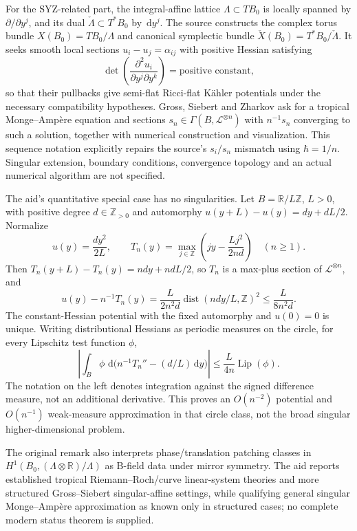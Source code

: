 \documentclass[11pt]{article}
\newcommand{\Z}{\mathbb{Z}}
\newcommand{\R}{\mathbb{R}}
\newcommand{\dd}{\,\mathrm{d}}
\begin{document}
For the SYZ-related part, the integral-affine lattice \(\Lambda\subset TB_0\) is locally spanned by \(\partial/\partial y^j\), and its dual \(\check\Lambda\subset T^*B_0\) by \(\dd y^j\). The source constructs the complex torus bundle \(X(B_0)=TB_0/\Lambda\) and canonical symplectic bundle \(\check X(B_0)=T^*B_0/\check\Lambda\). It seeks smooth local sections \(u_i-u_j=\alpha_{ij}\) with positive Hessian satisfying
\[
 \det\left(\frac{\partial^2u_i}{\partial y^j\partial y^k}\right)
       =\text{positive constant},
\]
so that their pullbacks give semi-flat Ricci-flat K\"ahler potentials under the necessary compatibility hypotheses. Gross, Siebert and Zharkov ask for a tropical Monge--Amp\`ere equation and sections \(s_n\in\Gamma(B,\mathcal L^{\otimes n})\) with \(n^{-1}s_n\) converging to such a solution, together with numerical construction and visualization. This sequence notation explicitly repairs the source's \(s_i/s_n\) mismatch using \(\hbar=1/n\). Singular extension, boundary conditions, convergence topology and an actual numerical algorithm are not specified.

The aid's quantitative special case has no singularities. Let \(B=\R/L\Z\), \(L>0\), with positive degree \(d\in\Z_{>0}\) and automorphy \(u(y+L)-u(y)=dy+dL/2\). Normalize
\[
 u(y)=\frac{dy^2}{2L},\qquad
 T_n(y)=\max_{j\in\Z}\left(jy-\frac{Lj^2}{2nd}\right)\quad(n\geq1).
\]
Then \(T_n(y+L)-T_n(y)=ndy+ndL/2\), so \(T_n\) is a max-plus section of \(\mathcal L^{\otimes n}\), and
\[
 u(y)-n^{-1}T_n(y)
 =\frac{L}{2n^2d}\operatorname{dist}(ndy/L,\Z)^2
 \leq\frac{L}{8n^2d}.
\]
The constant-Hessian potential with the fixed automorphy and \(u(0)=0\) is unique. Writing distributional Hessians as periodic measures on the circle, for every Lipschitz test function \(\phi\),
\[
 \left|\int_B\phi\,\dd\bigl(n^{-1}T_n''-(d/L)\dd y\bigr)\right|
 \leq\frac{L}{4n}\operatorname{Lip}(\phi).
\]
The notation on the left denotes integration against the signed difference measure, not an additional derivative. This proves an \(O(n^{-2})\) potential and \(O(n^{-1})\) weak-measure approximation in that circle class, not the broad singular higher-dimensional problem.

The original remark also interprets phase/translation patching classes in \(H^1(B_0,(\Lambda\otimes\R)/\Lambda)\) as B-field data under mirror symmetry. The aid reports established tropical Riemann--Roch/curve linear-system theories and more structured Gross--Siebert singular-affine settings, while qualifying general singular Monge--Amp\`ere approximation as known only in structured cases; no complete modern status theorem is supplied.
\end{document}
